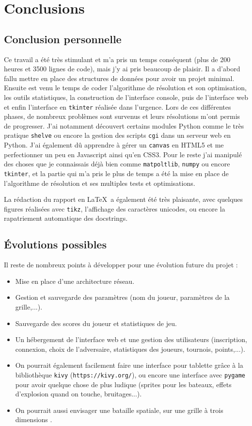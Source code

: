 \chapter{Conclusions}
\section{Conclusion personnelle}
Ce travail a été très stimulant et m'a pris un temps conséquent (plus de 200 heures et 3500 lignes de code), mais j'y ai pris beaucoup de plaisir. Il a d'abord fallu mettre en place des structures de données pour avoir un projet minimal. Ensuite est venu le temps de coder l'algorithme de résolution et son optimisation, les outils statistiques, la construction de l'interface console, puis de l'interface web et enfin l'interface en \texttt{tkinter} réalisée dans l'urgence. Lors de ces différentes phases, de nombreux problèmes sont survenus et leurs résolutions m'ont permis de progresser. J'ai notamment découvert certains modules Python comme le très pratique \texttt{shelve} ou encore la gestion des scripts \texttt{cgi} dans un serveur web en Python. J'ai également dû apprendre à gérer un \texttt{canvas} en HTML5 et me perfectionner un peu en Javascript ainsi qu'en CSS3. Pour le reste j'ai manipulé des choses que je connaissais déjà bien comme \texttt{matpoltlib}, \texttt{numpy} ou encore \texttt{tkinter}, et la partie qui m'a pris le plus de temps a été la mise en place de l'algorithme de résolution et ses multiples tests et optimisations.

\medskip

La rédaction du rapport en \LaTeX\ a également été très plaisante, avec quelques figures réalisées avec \texttt{tikz}, l'affichage des caractères unicodes, ou encore la rapatriement automatique des docstrings. 

\section{Évolutions possibles}
Il reste de nombreux points à développer pour une évolution future du projet :
\begin{itemize}
\item Mise en place d'une architecture réseau.
\item Gestion et sauvegarde des paramètres (nom du joueur, paramètres de la grille,...).
\item Sauvegarde des scores du joueur et statistiques de jeu.
\item Un hébergement de l'interface web et une gestion des utilisateurs (inscription, connexion, choix de l'adversaire, statistiques des joueurs, tournois, points,...).
\item On pourrait également facilement faire une interface pour tablette grâce à la bibliothèque \texttt{kivy} (\texttt{https://kivy.org/}), ou encore une interface avec \texttt{pygame} pour avoir quelque chose de plus ludique (sprites pour les bateaux, effets d'explosion quand on touche, bruitages...).
\item On pourrait aussi envisager une bataille spatiale, sur une grille à trois dimensions  .
\end{itemize}


